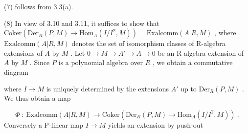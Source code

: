 (7)  follows from 3.3(a).



(8)  In view of 3.10 and 3.11, it suffices to show that $\mathrm{Coker}(\mathrm{Der}_R(P, M) \to \mathrm{Hom}_A(I/I^2, M)) = \mathrm{Exalcomm}(A|R, M)$ , where  $\mathrm{Exalcomm}(A|R, M)$ denotes the set of isomorphism classes of R-algebra extensions of  $A$  by  $M$ . Let $0 \to M \to A' \to A \to 0$   be an R-algebra extension of  $A$  by  $M$ . Since  $P$  is a polynomial algebra over  $R$ , we obtain a commutative diagram

\begin{center}
\end{center}
where  $I \to M$  is uniquely determined by the extensions  $A'$  up to  $\mathrm{Der}_R(P, M)$  . We thus obtain a map

\begin{equation*}
\Phi \ : \ \mathrm{Exalcomm}(A|R, M) \to \mathrm{Coker}(\mathrm{Der}_R(P, M) \to \mathrm{Hom}_A(I/I^2, M))  \ .
\end{equation*}
Conversely a P-linear map  $I \to M$  yields an extension by push-out

